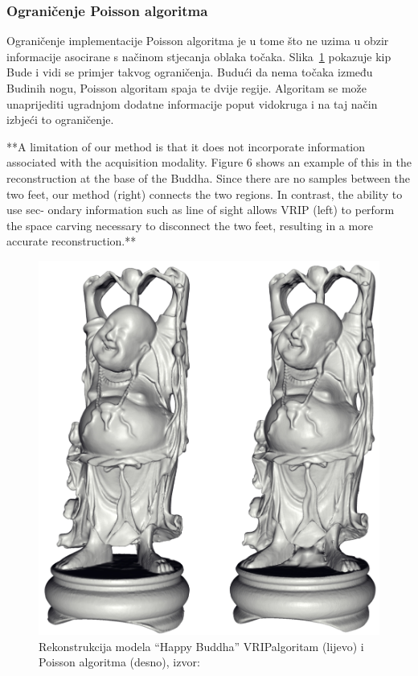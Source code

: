 \subsubsection{Ograničenje Poisson algoritma} %
\label{ssub:Ograničenje Poisson algoritma}

Ograničenje implementacije Poisson algoritma je u tome što ne uzima u
obzir informacije asocirane s načinom stjecanja oblaka točaka.
Slika~\ref{fig:poisson-buddha.png} pokazuje kip Bude i vidi se primjer takvog
ograničenja. Budući da nema točaka između Budinih nogu, Poisson
algoritam spaja te dvije regije. Algoritam se može unaprijediti
ugradnjom dodatne informacije poput vidokruga i na taj način izbjeći to
ograničenje.

**A limitation of our method
is that it does not incorporate information associated with
the acquisition modality. Figure 6 shows an example of this
in the reconstruction at the base of the Buddha. Since there
are no samples between the two feet, our method (right)
connects the two regions. In contrast, the ability to use sec-
ondary information such as line of sight allows VRIP (left)
to perform the space carving necessary to disconnect the two
feet, resulting in a more accurate reconstruction.**


\begin{figure}[h]
\centering
\includegraphics[scale=0.20]{figures/poisson-buddha.png}
\caption[]{Rekonstrukcija modela ``Happy Buddha'' 
VRIP\footnotemark[2] algoritam (lijevo) i Poisson algoritma (desno),
izvor:~\cite{Kazhdan:2006}}
\label{fig:poisson-buddha.png}
\end{figure}

